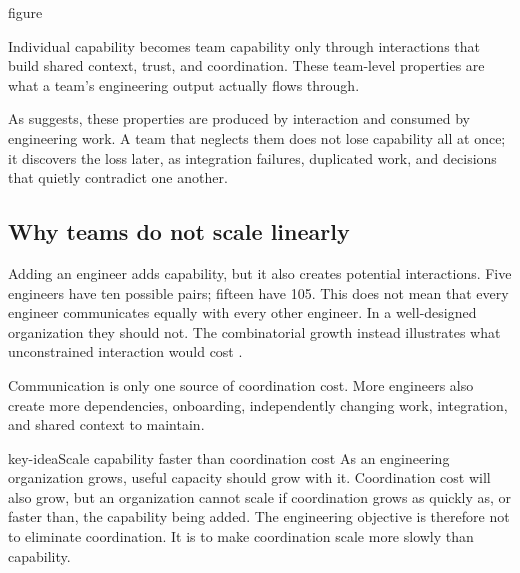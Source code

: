 \begin{bookbox}{figure}{} %
\pandocbounded{}

Individual capability becomes team capability only through interactions that build shared context,
trust, and coordination. These team-level properties are what a team's engineering output actually
flows through.
\end{bookbox}

As \citet{fig-team-capability} suggests, these properties are produced by interaction and consumed by
engineering work. A team that neglects them does not lose capability all at once; it discovers the
loss later, as integration failures, duplicated work, and decisions that quietly contradict one
another.

\subsection{Why teams do not scale linearly}\label{sec-team-scaling}

Adding an engineer adds capability, but it also creates potential interactions. Five engineers have
ten possible pairs; fifteen have 105. This does not mean that every engineer communicates equally
with every other engineer. In a well-designed organization they should not. The combinatorial growth
instead illustrates what unconstrained interaction would cost \citep{brooks1995}.

Communication is only one source of coordination cost. More engineers also create more dependencies,
onboarding, independently changing work, integration, and shared context to maintain.

\begin{bookbox}{key-idea}{Scale capability faster than coordination cost} %
As an engineering organization grows, useful capacity should grow with it. Coordination cost will
also grow, but an organization cannot scale if coordination grows as quickly as, or faster than, the
capability being added. The engineering objective is therefore not to eliminate coordination. It is
to make coordination scale more slowly than capability.
\end{bookbox}

